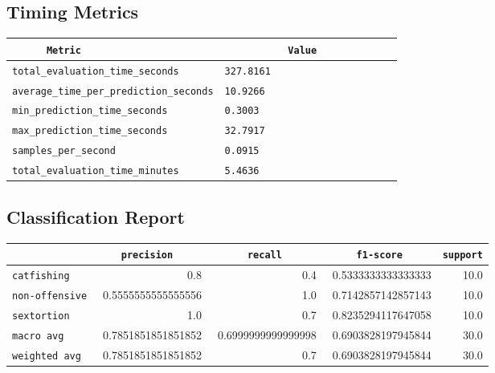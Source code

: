\documentclass{article}
\begin{document}
\subsection{Timing Metrics}

\begin{center}
\begin{tabular}{l | l} \hline
    \verb|      Metric     | & \verb|           Value           | \\ \hline
    \hline
    \verb|total_evaluation_time_seconds| & \verb|327.8161                     | \\ \hline
    \verb|average_time_per_prediction_seconds| & \verb|10.9266                      | \\ \hline
    \verb|min_prediction_time_seconds| & \verb|0.3003                       | \\ \hline
    \verb|max_prediction_time_seconds| & \verb|32.7917                      | \\ \hline
    \verb|samples_per_second| & \verb|0.0915                       | \\ \hline
    \verb|total_evaluation_time_minutes| & \verb|5.4636                       | \\ \hline
\end{tabular}
\end{center}

\subsection{Classification Report}

\begin{center}
\begin{tabular}{l | r | r | r | r} \hline
    \verb|            | & \verb|    precision     | & \verb|      recall      | & \verb|     f1-score     | & \verb|support| \\ \hline
    \hline
    \verb|catfishing | & 0.8 & 0.4 & 0.5333333333333333 &    10.0 \\ \hline
    \verb|non-offensive| & 0.5555555555555556 & 1.0 & 0.7142857142857143 &    10.0 \\ \hline
    \verb|sextortion | & 1.0 & 0.7 & 0.8235294117647058 &    10.0 \\ \hline
    \verb|macro avg  | & 0.7851851851851852 & 0.6999999999999998 & 0.6903828197945844 &    30.0 \\ \hline
    \verb|weighted avg| & 0.7851851851851852 & 0.7 & 0.6903828197945844 &    30.0 \\ \hline
\end{tabular}
\end{center}
\end{document}
